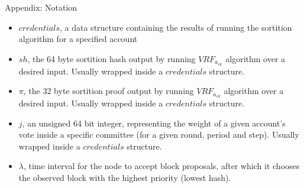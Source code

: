 \documentclass[10pt,a4paper]{article}
\begin{document}
\begin{section}{Appendix: Notation}


\begin{itemize}
    \item $credentials$, a data structure containing the results of running the sortition algorithm 
    for a specified account
    \item $sh$, the 64 byte sortition hash output by running $VRF_{a_{sk}}$ algorithm over a desired input.
    Usually wrapped inside a $credentials$ structure.
    \item $\pi$, the 32 byte sortition proof output by running $VRF_{a_{sk}}$ algorithm over a desired input.
    Usually wrapped inside a $credentials$ structure.
    \item $j$, an unsigned 64 bit integer, representing the weight of a given account's vote inside a specific committee
    (for a given round, period and step).
    Usually wrapped inside a $credentials$ structure.
    \item $\lambda$, time interval for the node to accept block proposals, after which it 
    chooses the observed block with the highest priority (lowest hash).


\end{itemize}
\end{section}
\end{document}
